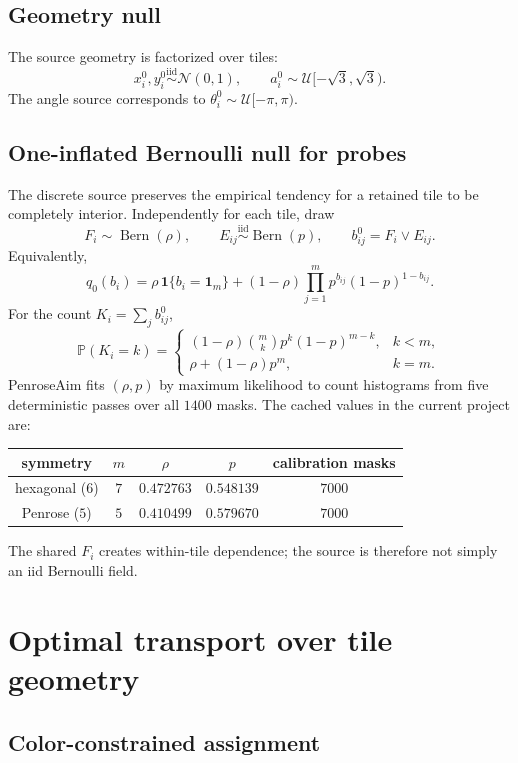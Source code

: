 \documentclass[11pt]{article}
\newcommand{\Pp}{\mathbb{P}}
\newcommand{\Ber}{\operatorname{Bern}}
\newcommand{\1}{\mathbf{1}}
\begin{document}
\subsection{Geometry null}

The source geometry is factorized over tiles:
\[
  x_i^0,y_i^0\overset{\text{iid}}{\sim}\mathcal N(0,1),
  \qquad
  a_i^0\sim\mathcal U[-\sqrt3,\sqrt3).
\]
The angle source corresponds to \(\theta_i^0\sim\mathcal U[-\pi,\pi)\).

\subsection{One-inflated Bernoulli null for probes}

The discrete source preserves the empirical tendency for a retained tile to
be completely interior.  Independently for each tile, draw
\[
  F_i\sim\Ber(\rho),\qquad E_{ij}\overset{\text{iid}}{\sim}\Ber(p),
  \qquad b^0_{ij}=F_i\lor E_{ij}.
\]
Equivalently,
\[
q_0(b_i)=
  \rho\,\1\{b_i=\mathbf1_m\}
  +(1-\rho)\prod_{j=1}^m p^{b_{ij}}(1-p)^{1-b_{ij}}.
\]
For the count \(K_i=\sum_j b^0_{ij}\),
\[
 \Pp(K_i=k)=
 \begin{cases}
 (1-\rho)\binom{m}{k}p^k(1-p)^{m-k},&k<m,\\
 \rho+(1-\rho)p^m,&k=m.
 \end{cases}
\]
PenroseAim fits \((\rho,p)\) by maximum likelihood to count histograms from
five deterministic passes over all \(1400\) masks.  The cached values in the
current project are:
\begin{center}
\begin{tabular}{@{}ccccc@{}}
\toprule
symmetry & \(m\) & \(\rho\) & \(p\) & calibration masks\\
\midrule
hexagonal (\(6\)) & \(7\) & \(0.472763\) & \(0.548139\) & \(7000\)\\
Penrose (\(5\))   & \(5\) & \(0.410499\) & \(0.579670\) & \(7000\)\\
\bottomrule
\end{tabular}
\end{center}
The shared \(F_i\) creates within-tile dependence; the source is therefore
not simply an iid Bernoulli field.

\section{Optimal transport over tile geometry}

\subsection{Color-constrained assignment}
\end{document}

